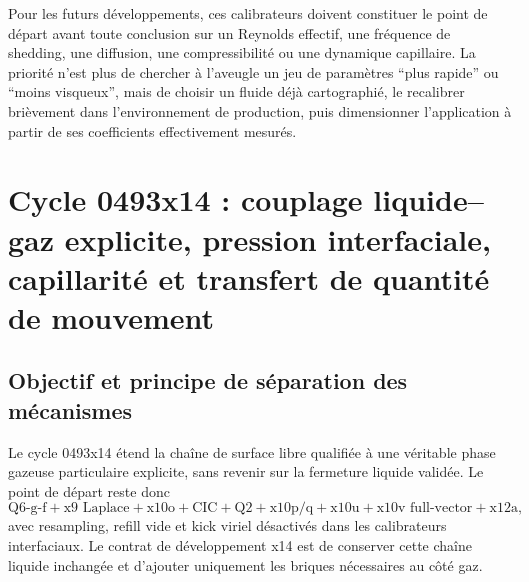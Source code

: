\documentclass[11pt,a4paper]{article}
\begin{document}
Pour les futurs développements, ces calibrateurs doivent constituer le point de départ avant toute conclusion sur un Reynolds effectif, une fréquence de shedding, une diffusion, une compressibilité ou une dynamique capillaire. La priorité n'est plus de chercher à l'aveugle un jeu de paramètres ``plus rapide'' ou ``moins visqueux'', mais de choisir un fluide déjà cartographié, le recalibrer brièvement dans l'environnement de production, puis dimensionner l'application à partir de ses coefficients effectivement mesurés.




\section{Cycle 0493x14 : couplage liquide--gaz explicite, pression interfaciale, capillarité et transfert de quantité de mouvement}
\label{sec:x14-liquid-gas}

\subsection{Objectif et principe de séparation des mécanismes}

Le cycle 0493x14 étend la chaîne de surface libre qualifiée à une véritable phase gazeuse particulaire explicite, sans revenir sur la fermeture liquide validée. Le point de départ reste donc
\begin{equation}
  \text{Q6-g-f}
  + \text{x9 Laplace}
  + \text{x10o}
  + \text{CIC}
  + \text{Q2}
  + \text{x10p/q}
  + \text{x10u}
  + \text{x10v full-vector}
  + \text{x12a},
\end{equation}
avec resampling, refill vide et kick viriel désactivés dans les calibrateurs interfaciaux. Le contrat de développement x14 est de conserver cette chaîne liquide inchangée et d'ajouter uniquement les briques nécessaires au côté gaz.
\end{document}
